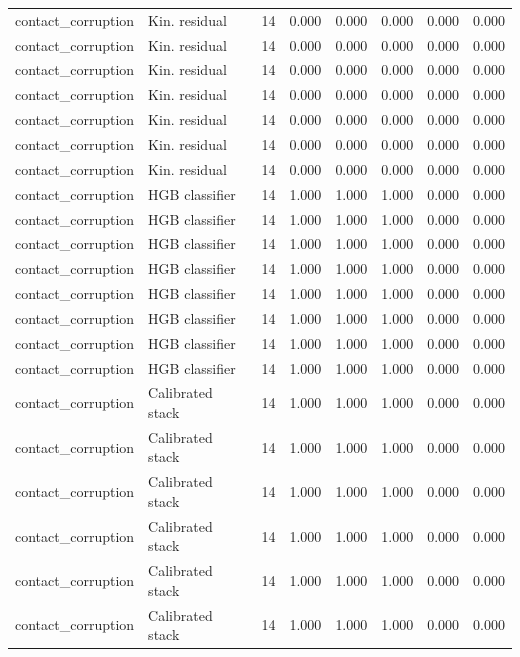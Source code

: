 {\begin{longtable}{llrrrrrr}
contact\_corruption & Kin. residual & 14 & 0.000 & 0.000 & 0.000 & 0.000 & 0.000 \\
contact\_corruption & Kin. residual & 14 & 0.000 & 0.000 & 0.000 & 0.000 & 0.000 \\
contact\_corruption & Kin. residual & 14 & 0.000 & 0.000 & 0.000 & 0.000 & 0.000 \\
contact\_corruption & Kin. residual & 14 & 0.000 & 0.000 & 0.000 & 0.000 & 0.000 \\
contact\_corruption & Kin. residual & 14 & 0.000 & 0.000 & 0.000 & 0.000 & 0.000 \\
contact\_corruption & Kin. residual & 14 & 0.000 & 0.000 & 0.000 & 0.000 & 0.000 \\
contact\_corruption & Kin. residual & 14 & 0.000 & 0.000 & 0.000 & 0.000 & 0.000 \\
contact\_corruption & HGB classifier & 14 & 1.000 & 1.000 & 1.000 & 0.000 & 0.000 \\
contact\_corruption & HGB classifier & 14 & 1.000 & 1.000 & 1.000 & 0.000 & 0.000 \\
contact\_corruption & HGB classifier & 14 & 1.000 & 1.000 & 1.000 & 0.000 & 0.000 \\
contact\_corruption & HGB classifier & 14 & 1.000 & 1.000 & 1.000 & 0.000 & 0.000 \\
contact\_corruption & HGB classifier & 14 & 1.000 & 1.000 & 1.000 & 0.000 & 0.000 \\
contact\_corruption & HGB classifier & 14 & 1.000 & 1.000 & 1.000 & 0.000 & 0.000 \\
contact\_corruption & HGB classifier & 14 & 1.000 & 1.000 & 1.000 & 0.000 & 0.000 \\
contact\_corruption & HGB classifier & 14 & 1.000 & 1.000 & 1.000 & 0.000 & 0.000 \\
contact\_corruption & Calibrated stack & 14 & 1.000 & 1.000 & 1.000 & 0.000 & 0.000 \\
contact\_corruption & Calibrated stack & 14 & 1.000 & 1.000 & 1.000 & 0.000 & 0.000 \\
contact\_corruption & Calibrated stack & 14 & 1.000 & 1.000 & 1.000 & 0.000 & 0.000 \\
contact\_corruption & Calibrated stack & 14 & 1.000 & 1.000 & 1.000 & 0.000 & 0.000 \\
contact\_corruption & Calibrated stack & 14 & 1.000 & 1.000 & 1.000 & 0.000 & 0.000 \\
contact\_corruption & Calibrated stack & 14 & 1.000 & 1.000 & 1.000 & 0.000 & 0.000 \\

\end{longtable}}
